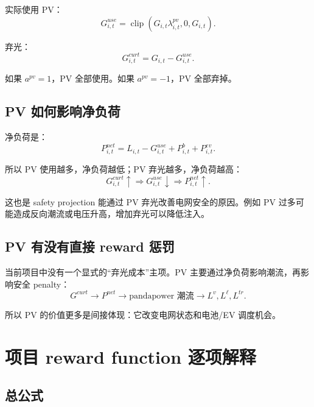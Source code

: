 \documentclass[UTF8,zihao=-4]{ctexart}
\begin{document}
实际使用 PV：
\begin{equation}
G^{use}_{i,t}
=
\operatorname{clip}
\left(
G_{i,t}\lambda^{pv}_{i,t},
0,
G_{i,t}
\right).
\end{equation}

弃光：
\begin{equation}
G^{curt}_{i,t}=G_{i,t}-G^{use}_{i,t}.
\end{equation}

如果 $a^{pv}=1$，PV 全部使用。如果 $a^{pv}=-1$，PV 全部弃掉。

\subsection{PV 如何影响净负荷}

净负荷是：
\begin{equation}
P^{net}_{i,t}
=
L_{i,t}
-
G^{use}_{i,t}
+
P^b_{i,t}
+
P^{ev}_{i,t}.
\end{equation}

所以 PV 使用越多，净负荷越低；PV 弃光越多，净负荷越高：
\begin{equation}
G^{curt}_{i,t}\uparrow
\Rightarrow
G^{use}_{i,t}\downarrow
\Rightarrow
P^{net}_{i,t}\uparrow.
\end{equation}

这也是 safety projection 能通过 PV 弃光改善电网安全的原因。例如 PV 过多可能造成反向潮流或电压升高，增加弃光可以降低注入。

\subsection{PV 有没有直接 reward 惩罚}

当前项目中没有一个显式的“弃光成本”主项。PV 主要通过净负荷影响潮流，再影响安全 penalty：
\begin{equation}
G^{curt}
\rightarrow
P^{net}
\rightarrow
\text{pandapower 潮流}
\rightarrow
L^v,L^\ell,L^{tr}.
\end{equation}

所以 PV 的价值更多是间接体现：它改变电网状态和电池/EV 调度机会。

\section{项目 reward function 逐项解释}

\subsection{总公式}
\end{document}
